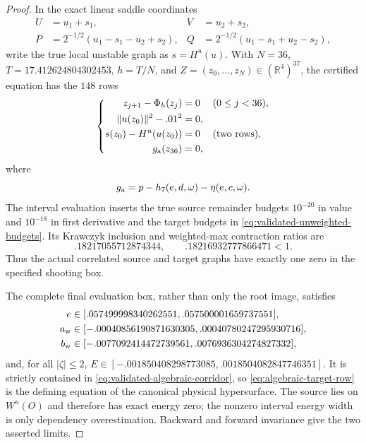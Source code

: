 \documentclass[11pt]{amsart}
\numberwithin{equation}{section}
\theoremstyle{definition}
\theoremstyle{remark}
\newcommand{\R}{\mathbb R}
\begin{document}
\begin{proof}
In the exact linear saddle coordinates
\begin{equation}\label{eq:core-linear-saddle-coordinates}
 \begin{aligned}
 U&=u_1+s_1,& V&=u_2+s_2,\\
 P&=2^{-1/2}(u_1-s_1-u_2+s_2),&
 Q&=2^{-1/2}(u_1-s_1+u_2-s_2),
 \end{aligned}
\end{equation}
write the true local unstable graph as $s=H^u(u)$.  With $N=36$,
$T=17.412624804302453$, $h=T/N$, and
$Z=(z_0,\ldots,z_N)\in(\R^4)^{37}$, the certified equation has the $148$
rows
\begin{equation}\label{eq:algebraic-shooting-rows}
 \left\{
 \begin{aligned}
 z_{j+1}-\Phi_h(z_j)&=0 &&(0\le j<36),\\
 \|u(z_0)\|^2-.01^2&=0,\\
 s(z_0)-H^u(u(z_0))&=0 &&\text{(two rows)},\\
 g_{\rm a}(z_{36})&=0,
 \end{aligned}\right.
\end{equation}
where
\begin{equation}\label{eq:algebraic-target-row}
 g_{\rm a}=p-h_7(e,d,\omega)-\eta(e,c,\omega).
\end{equation}
The interval evaluation inserts the true source remainder budgets
$10^{-20}$ in value and $10^{-18}$ in first derivative and the target
budgets in \eqref{eq:validated-unweighted-budgets}.  Its Krawczyk inclusion
and weighted-max contraction ratios are
\begin{equation}\label{eq:algebraic-krawczyk-ratios}
 .18217055712874344,\qquad .18216932777866471<1.
\end{equation}
Thus the actual correlated source and target graphs have exactly one zero
in the specified shooting box.

The complete final evaluation box, rather than only the root image,
satisfies
\begin{align}
 e&\in[.057499998340262551,.057500001659737551],\notag\\
 a_{\rm w}&\in[-.00040856190871630305,.00040780247295930716],
 \label{eq:algebraic-terminal-contract}\\
 b_{\rm w}&\in[-.0077092414472739561,.0076936304274827332],\notag
\end{align}
and, for all $|\zeta|\le2$,
$E\in[-.001850408298773085,.0018504082847746351]$.
It is strictly contained in \eqref{eq:validated-algebraic-corridor}, so
\eqref{eq:algebraic-target-row} is the defining equation of the canonical physical
hypersurface.  The source lies on $W^u(O)$ and therefore has exact energy
zero; the nonzero interval energy width is only dependency overestimation.
Backward and forward invariance give the two asserted limits.


\end{proof}
\end{document}
